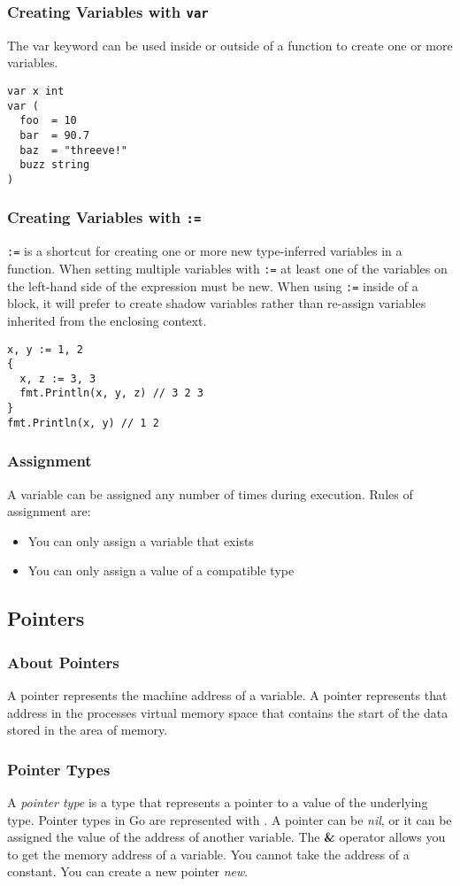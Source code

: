\documentclass{beamer}
\begin{document}
\begin{frame}[fragile]
  \frametitle{Creating Variables with {\tt var}}
  The var keyword can be used inside or outside of a function to
  create one or more variables.
\begin{lstlisting}[language=Golang]
var x int
var (
  foo  = 10
  bar  = 90.7
  baz  = "threeve!"
  buzz string
)
\end{lstlisting}
\end{frame}

\begin{frame}[fragile]
  \frametitle{Creating Variables with {\tt :=}}
  {\tt:=} is a shortcut for creating one or more new type-inferred
  variables in a function.  When setting multiple variables with
  {\tt:=} at least one of the variables on the left-hand side of the
  expression must be new.  When using {\tt :=} inside of a block, it
  will prefer to create shadow variables rather than re-assign
  variables inherited from the enclosing context.
\begin{lstlisting}[language=Golang]
x, y := 1, 2
{
  x, z := 3, 3
  fmt.Println(x, y, z) // 3 2 3
}
fmt.Println(x, y) // 1 2
\end{lstlisting}
\end{frame}

\begin{frame}
  \frametitle{Assignment}
  A variable can be assigned any number of times during execution.
  Rules of assignment are:
  \begin{itemize}
  \item You can only assign a variable that exists
  \item You can only assign a value of a compatible type
  \end{itemize}
\end{frame}

\subsection{Pointers}
\begin{frame}
  \frametitle{About Pointers}
  A pointer represents the machine address of a variable.  A pointer
  represents that address in the processes virtual memory space that
  contains the start of the data stored in the area of memory.
\end{frame}

\begin{frame}
  \frametitle{Pointer Types}
  A \emph{pointer type} is a type that represents a pointer to a value
  of the underlying type.  Pointer types in Go are represented with
  {\bf *}.  A pointer can be \emph{nil}, or it can be assigned the
  value of the address of another variable.  The {\bf \&} operator
  allows you to get the memory address of a variable.  You cannot take
  the address of a constant.  You can create a new pointer \emph{new}.
\end{frame}
\end{document}
